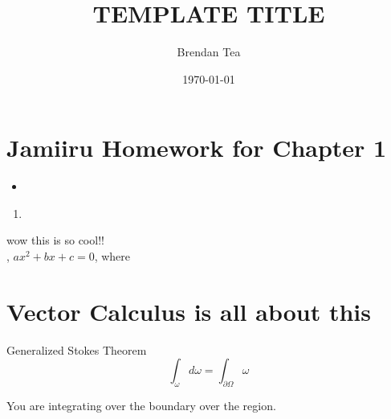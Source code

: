 \documentclass{article}
\title{TEMPLATE TITLE}
\author{Brendan Tea}
\date{\today}
\theoremstyle{solution}
\begin{document}
\maketitle

\section{Jamiiru Homework for Chapter 1}

\begin{itemize}
    \item 
\end{itemize}


\begin{enumerate}
    \item 
\end{enumerate}


wow this is so cool!! $$ $$, $ax^2+bx+c=0$, where


\section{Vector Calculus is all about this}
Generalized Stokes Theorem
\begin{equation}
    \int_{\omega}^{} d \omega = \int_{\partial \Omega}^{} \omega
\end{equation}

You are integrating over the boundary over the region.
\end{document}
